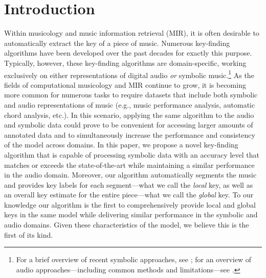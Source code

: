 \documentclass[sigconf]{acmart}
\begin{document}


\maketitle

\section{Introduction}
Within musicology and music information retrieval (MIR), it is often desirable to automatically extract the key of a piece of music. Numerous key-finding algorithms have been developed over the past decades for exactly this purpose. Typically, however, these key-finding algorithms are domain-specific, working exclusively on either representations of digital audio \emph{or} symbolic music.\footnote{For a brief overview of recent symbolic approaches, see \cite{quinn2017}; for an overview of audio approaches---including common methods and limitations---see \cite{korzeniowski017}.} As the fields of computational musicology and MIR continue to grow, it is becoming more common for numerous tasks to require datasets that include both symbolic and audio representations of music (e.g., music performance analysis, automatic chord analysis, etc.). In this scenario, applying the same algorithm to the audio and symbolic data could prove to be convenient for accessing larger amounts of annotated data and to simultaneously increase the performance and consistency of the model across domains. In this paper, we propose a novel key-finding algorithm that is capable of processing symbolic data with an accuracy level that matches or exceeds the state-of-the-art \cite{albrecht2013use} while maintaining a similar performance in the audio domain. Moreover, our algorithm automatically segments the music and provides key labels for each segment---what we call the \emph{local} key, as well as an overall key estimate for the entire piece---what we call the \emph{global} key. To our knowledge our algorithm is the first to comprehensively provide local and global keys in the same model while delivering similar performance in the symbolic and audio domains. Given these characteristics of the model, we believe this is the first of its kind.
\end{document}
